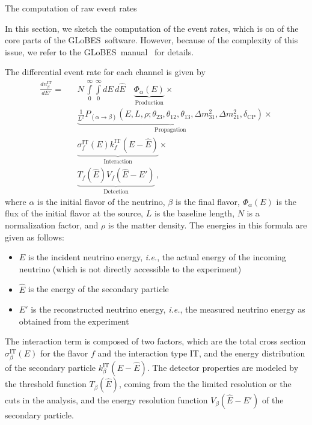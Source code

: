 \documentclass[12pt,a4paper]{article}
\makeatletter
\renewcommand{\section}{\@startsection{section}{1}{0em}{-\baselineskip}%
{\baselineskip}{\normalfont\large\bfseries}}
\newcommand{\ie}{{\it i.e.}}
\newcommand{\deltacp}{\delta_{\mathrm{CP}}}
\newcommand{\GLOBES}{{\sf GLoBES}}
\makeatother
\begin{document}
\section{The computation of raw event rates}

In this section, we sketch the computation of 
the event rates, which is on of the core parts of the \GLOBES\
software. However, because of the complexity of this issue,
we refer to the \GLOBES\ manual~\cite{Manual} for
details.  

The differential event rate for each channel is given by
\begin{eqnarray}
\label{equ:master_event}
\frac{dn_{\beta}^{\text{IT}}}{dE'}=&&N\,\int\limits_0^\infty \int\limits_0^\infty dE\,d\hat{E}\quad
\underbrace{\Phi_{\alpha} (E)}_{\mathrm{Production}} \times \nonumber\\
&&\underbrace{\frac{1}{L^2} P_{(\alpha\rightarrow\beta)}(E,L,\rho;\theta_{23},
\theta_{12},\theta_{13},
\Delta m^2_{31},\Delta m^2_{21},\deltacp)}_{\mathrm{Propagation}}
\times \nonumber \\ &&\underbrace{\sigma^{\text{IT}}_f(E)
k_f^{\text{IT}}(E-\hat{E})}_{\mathrm{Interaction}} \times \nonumber \\
&&\underbrace{ T_f(\hat{E}) V_f(\hat{E}-E')}_{\mathrm{Detection}}\,,
\end{eqnarray}
where $\alpha$ is the initial flavor of the neutrino, 
$\beta$ is the final flavor, $\Phi_{\alpha} (E)$ is the flux of the 
initial flavor at the
source, $L$ is the baseline length, $N$ is a normalization factor, and 
$\rho$ is the matter density. The energies in this formula are given as follows:
\begin{itemize}
\item
 $E$ is the incident neutrino energy, \ie, the actual energy of the 
incoming neutrino (which is not directly accessible to the experiment)
\item
 $\hat{E}$ is the energy of the secondary particle
\item
 $E'$ is the reconstructed neutrino energy, \ie, the measured
neutrino energy as obtained from the experiment
\end{itemize}
The interaction term is composed of 
two factors, which are the total cross section 
$\sigma^{\text{IT}}_\beta(E)$ for the flavor $f$ and
the interaction type IT, and the energy distribution of the 
secondary particle $k_\beta^{\text{IT}}(E-\hat{E})$.
The detector properties are 
modeled by the threshold function $T_\beta(\hat{E})$, coming from the the 
limited resolution or the cuts in the analysis, and the energy resolution 
function $V_\beta(\hat{E}-E')$ of the secondary particle. 
\end{document}
